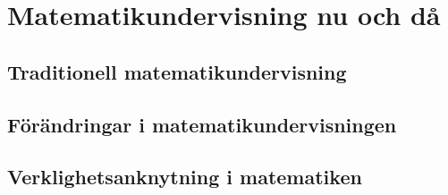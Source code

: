 \documentclass[11 pt,a4paper]{article}
\begin{document}



\newpage

\renewcommand\abstractname{Sammandrag}\begin{abstract}

\end{abstract}

\newpage

\renewcommand\abstractname{Abstract}
\begin{abstract} 

\end{abstract}

\newpage
 
\tableofcontents

\newpage
{}

%    

%     
    
    \section{Matematikundervisning nu och då}
        
        
    \subsection{Traditionell matematikundervisning}
        
    
    \subsection{Förändringar i matematikundervisningen}
        
        \label{sec:Forandringar}
        
    \subsection{Verklighetsanknytning i matematiken}
    \label{sec:Verklighetsanknytning}
        
        
\end{document}
